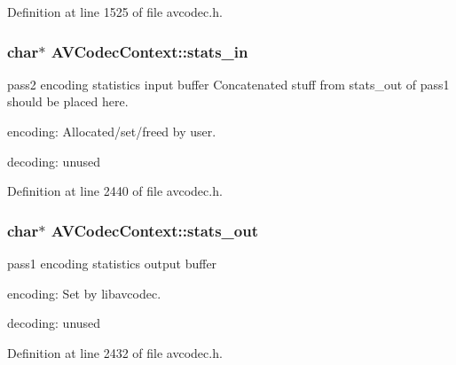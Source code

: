 Definition at line 1525 of file avcodec.\+h.

\subsubsection[{\texorpdfstring{stats\+\_\+in}{stats_in}}]{\setlength{\rightskip}{0pt plus 5cm}char$\ast$ A\+V\+Codec\+Context\+::stats\+\_\+in}\hypertarget{struct_a_v_codec_context_a4ee62148c5519301149f75e7296e84e1}{}\label{struct_a_v_codec_context_a4ee62148c5519301149f75e7296e84e1}
pass2 encoding statistics input buffer Concatenated stuff from stats\+\_\+out of pass1 should be placed here.
\begin{DoxyItemize}
\item encoding\+: Allocated/set/freed by user.
\item decoding\+: unused 
\end{DoxyItemize}

Definition at line 2440 of file avcodec.\+h.

\subsubsection[{\texorpdfstring{stats\+\_\+out}{stats_out}}]{\setlength{\rightskip}{0pt plus 5cm}char$\ast$ A\+V\+Codec\+Context\+::stats\+\_\+out}\hypertarget{struct_a_v_codec_context_a0f5bec27a856369ac81ccc9784f52e86}{}\label{struct_a_v_codec_context_a0f5bec27a856369ac81ccc9784f52e86}
pass1 encoding statistics output buffer
\begin{DoxyItemize}
\item encoding\+: Set by libavcodec.
\item decoding\+: unused 
\end{DoxyItemize}

Definition at line 2432 of file avcodec.\+h.

